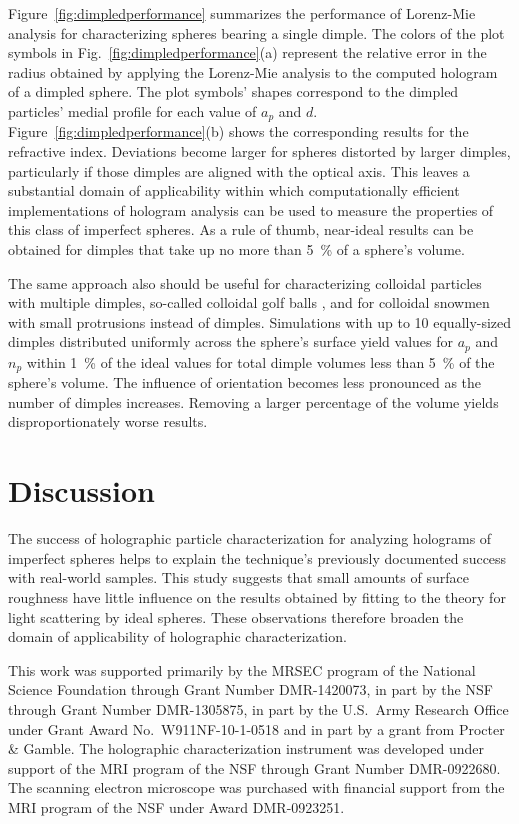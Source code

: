 Figure~\ref{fig:dimpledperformance} summarizes the performance of
Lorenz-Mie analysis for characterizing spheres bearing a single
dimple.
The colors of the plot symbols
in Fig.~\ref{fig:dimpledperformance}(a) represent the relative
error in the radius obtained by applying the Lorenz-Mie analysis
to the computed hologram of a dimpled sphere.
The plot symbols' shapes correspond to the
dimpled particles' medial profile for each value of $a_p$ and $d$.
Figure~\ref{fig:dimpledperformance}(b) shows the corresponding
results for the refractive index.
Deviations become larger for spheres distorted by larger dimples,
particularly if those dimples are aligned with the optical axis.
This leaves a substantial domain of applicability within which
computationally efficient implementations of hologram analysis
can be used to measure the properties of this class of
imperfect spheres.
As a rule of thumb, near-ideal results can be obtained for dimples
that take up no more than \SI{5}{\percent} of a sphere's volume.

The same approach also should be useful for characterizing
colloidal particles with multiple dimples, so-called colloidal golf
balls \cite{dai13},
and for colloidal snowmen \cite{chaturvedi12}
with small protrusions instead of dimples.
Simulations with up to 10 equally-sized dimples distributed
uniformly across the sphere's surface yield values for
$a_p$ and $n_p$ within \SI{1}{\percent} of the ideal values for total dimple
volumes less than \SI{5}{\percent} of the sphere's volume.
The influence of orientation becomes less pronounced as the number
of dimples increases.
Removing a larger percentage of the volume 
yields disproportionately worse results.

\section{Discussion}

The success of holographic particle characterization for analyzing
holograms of imperfect spheres helps to explain the technique's
previously documented success with real-world samples.
This study suggests that small amounts of surface roughness have
little influence on the results obtained by fitting to the theory
for light scattering by ideal spheres.
These observations therefore broaden the domain of applicability of
holographic characterization.

This work was supported primarily by the MRSEC program of the National
Science Foundation through Grant Number DMR-1420073, in part by the NSF
through Grant Number DMR-1305875, in part by
the U.S.\ Army Research Office under Grant Award No.\ W911NF-10-1-0518
and in part by a grant from Procter \& Gamble.
The holographic characterization instrument
was developed under support of the MRI program of the NSF through Grant Number
DMR-0922680.  The scanning electron microscope was purchased with financial
support from the MRI program of the NSF under Award DMR-0923251.

%
%
